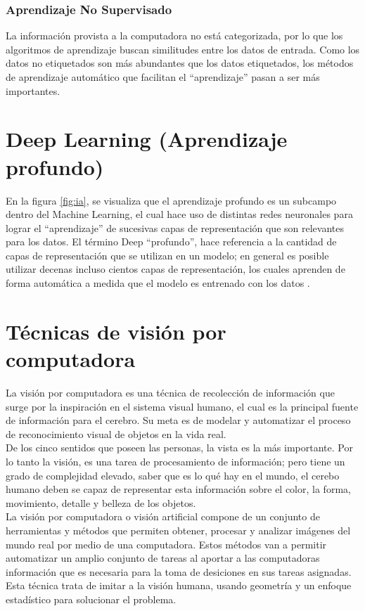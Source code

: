 \subsubsection{Aprendizaje No Supervisado}
La información provista a la computadora no está categorizada, por lo que los algoritmos de aprendizaje buscan similitudes entre los datos de entrada. Como los datos no etiquetados son más abundantes que los datos etiquetados, los métodos de aprendizaje automático que facilitan el ``aprendizaje'' pasan a ser más importantes.\\

\section{Deep Learning (Aprendizaje profundo)}
En la figura \ref{fig:ia}, se visualiza que el aprendizaje profundo es un subcampo dentro del Machine Learning, el cual hace uso de distintas redes neuronales para lograr el ``aprendizaje'' de sucesivas capas de representación que son relevantes para los datos. El término Deep ``profundo'', hace referencia a la cantidad de capas de representación que se utilizan en un modelo; en general es posible utilizar decenas incluso cientos capas de representación, los cuales aprenden de forma automática a medida que el modelo es entrenado con los datos \cite{iaarbook:artificialvision}.

\section{Técnicas de visión por computadora}
La visión por computadora es una técnica de recolección de información que surge por la inspiración en el sistema visual humano, el cual es la principal fuente de información para el cerebro. Su meta es de modelar y automatizar el proceso de reconocimiento visual de objetos en la vida real.\\

De los cinco sentidos que poseen las personas, la vista es la más importante. Por lo tanto la visión, es una tarea de procesamiento de información; pero tiene un grado de complejidad elevado, saber que es lo qué hay en el mundo, el cerebo humano deben se capaz de representar esta información sobre el color, la forma, movimiento, detalle y belleza de los objetos. \cite{iaarbook:artificialvision}\\

La visión por computadora o visión artificial compone de un conjunto de herramientas y métodos que permiten obtener, procesar y analizar imágenes del mundo real por medio de una computadora. Estos métodos van a permitir automatizar un amplio conjunto de tareas al aportar a las computadoras información que es necesaria para la toma de desiciones en sus tareas asignadas. Esta técnica trata de imitar a la visión humana, usando geometría y un enfoque estadístico para solucionar el problema.\\


